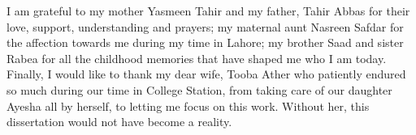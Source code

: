 I am grateful to my mother Yasmeen Tahir and my father, Tahir Abbas for their love, support, understanding and prayers; my maternal aunt Nasreen Safdar for the  affection towards me during my time in Lahore; my brother Saad and sister Rabea for all the childhood memories that have shaped me who I am today. Finally, I would like to thank my dear wife, Tooba Ather who patiently endured so much during our time in College Station, from taking care of our daughter Ayesha all by herself, to letting me focus on this work. Without her, this dissertation would not have become a reality.

\pagebreak{}
